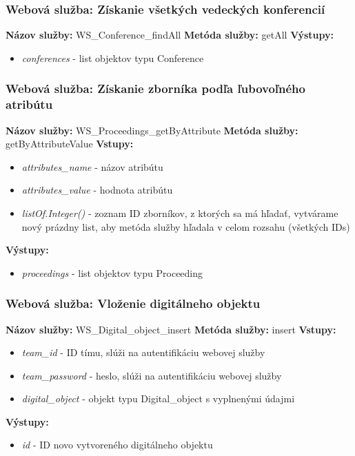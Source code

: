 \documentclass[10pt,oneside,slovak,a4paper]{article}
\begin{document}
\subsubsection{Webová služba: Získanie všetkých vedeckých konferencií}
\textbf{Názov služby:} WS\_Conference\_findAll
\textbf{Metóda služby:} getAll
\textbf{Výstupy:}
	\begin{itemize}
		\item \textit{conferences} - list objektov typu Conference
	\end{itemize}
	
\subsubsection{Webová služba: Získanie zborníka podľa ľubovoľného atribútu}
\textbf{Názov služby:} WS\_Proceedings\_getByAttribute
\textbf{Metóda služby:} getByAttributeValue
\textbf{Vstupy:}
	\begin{itemize}
		\item \textit{attributes\_name} - názov atribútu
		\item \textit{attributes\_value} - hodnota atribútu
		\item \textit{listOf.Integer()} - zoznam ID zborníkov, z ktorých sa má hľadať, vytvárame nový prázdny list, aby metóda služby hľadala v celom rozsahu (všetkých IDs)
	\end{itemize}
\textbf{Výstupy:}
	\begin{itemize}
		\item \textit{proceedings} - list objektov typu Proceeding
	\end{itemize}
	
\subsubsection{Webová služba: Vloženie digitálneho objektu}
\textbf{Názov služby:} WS\_Digital\_object\_insert
\textbf{Metóda služby:} insert
\textbf{Vstupy:}
	\begin{itemize}
		\item \textit{team\_id} - ID tímu, slúži na autentifikáciu webovej služby
		\item \textit{team\_password} - heslo, slúži na autentifikáciu webovej služby
		\item \textit{digital\_object} - objekt typu Digital\_object s vyplnenými údajmi
	\end{itemize}
\textbf{Výstupy:}
	\begin{itemize}
		\item \textit{id} - ID novo vytvoreného digitálneho objektu
	\end{itemize}
	
\end{document}
